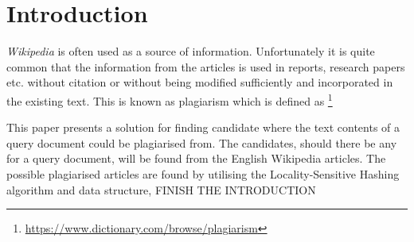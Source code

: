 \section{Introduction}


\emph{Wikipedia} is often used as a source of information. Unfortunately it is quite common that the information from the articles is used in reports, research papers etc. without citation or without being modified sufficiently and incorporated in the existing text. This is known as plagiarism which is defined as \emph{}\footnote{\url{https://www.dictionary.com/browse/plagiarism}}

This paper presents a solution for finding candidate where the text contents of a query document could be plagiarised from. The candidates, should there be any for a query document, will be found from the English Wikipedia articles. The possible plagiarised articles are found by utilising the Locality-Sensitive Hashing algorithm and data structure, FINISH THE INTRODUCTION